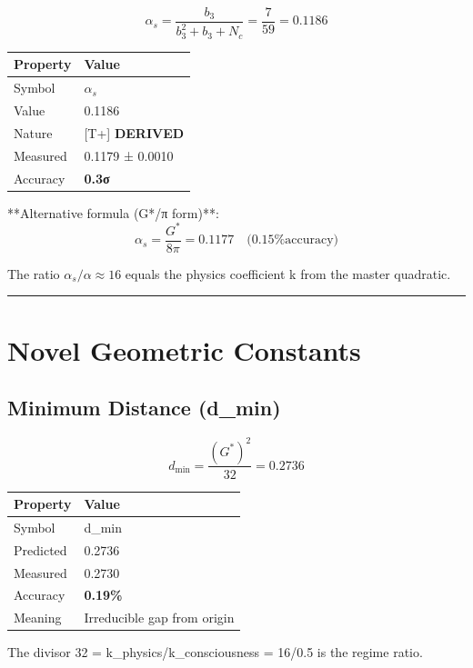 \documentclass[
  11pt,
  letterpaper,
  twoside,
  openany]{book}
\makeatletter
\let\orig@section\section
\renewcommand{\section}{\needspace{8\baselineskip}\orig@section}
\let\orig@subsection\subsection
\renewcommand{\subsection}{\needspace{6\baselineskip}\orig@subsection}
\makeatother
\begin{document}
\[
\alpha_s = \frac{b_3}{b_3^2 + b_3 + N_c} = \frac{7}{59} = 0.1186
\]

\begin{longtable}[]{@{}ll@{}}
\toprule\noalign{}
Property & Value \\
\midrule\noalign{}
\endhead
\bottomrule\noalign{}
\endlastfoot
Symbol & \(\alpha_s\) \\
Value & 0.1186 \\
Nature & {[}T+{]} \textbf{DERIVED} \\
Measured & 0.1179 ± 0.0010 \\
Accuracy & \textbf{0.3σ} \\
\end{longtable}

**Alternative formula (G*/π form)**:
\[\alpha_s = \frac{G^*}{8\pi} = 0.1177 \quad \text{(0.15\% accuracy)}\]

The ratio \(\alpha_s/\alpha \approx 16\) equals the physics coefficient
k from the master quadratic.

\begin{center}\rule{0.5\linewidth}{0.5pt}\end{center}

\section{Novel Geometric Constants}\label{novel-geometric-constants}

\subsection{Minimum Distance (d\_min)}\label{minimum-distance-d_min}

\[
d_{\min} = \frac{(G^*)^2}{32} = 0.2736
\]

\begin{longtable}[]{@{}ll@{}}
\toprule\noalign{}
Property & Value \\
\midrule\noalign{}
\endhead
\bottomrule\noalign{}
\endlastfoot
Symbol & d\_min \\
Predicted & 0.2736 \\
Measured & 0.2730 \\
Accuracy & \textbf{0.19\%} \\
Meaning & Irreducible gap from origin \\
\end{longtable}

The divisor 32 = k\_physics/k\_consciousness = 16/0.5 is the regime
ratio.
\end{document}
